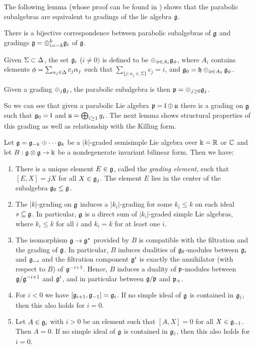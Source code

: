 The following lemma (whose proof can be found in \cite{cap_parabolic_2009}) shows that the parabolic subalgebras are equivalent to gradings of the lie algebra $\mathfrak{g}$.
\begin{lemma}
There is a bijective correspondence between parabolic subalgebras of $\mathfrak{g}$ and gradings $\mathfrak{g}=\oplus_{i=-k}^k \mathfrak{g}_i$ of $\mathfrak{g}$.

	Given $\Sigma\subset\Delta$, the set $\mathfrak{g}_i$ ($i\neq 0)$ is defined to be $\oplus_{\phi\in A_i} \mathfrak{g}_\phi$, where $A_i$ contains elements $\phi=\sum_{\alpha_j\in\Delta} c_j \alpha_j$ such that $\sum_{\{j:\alpha_j\in\Sigma\}} c_j=i$, and $\mathfrak{g}_0=\mathfrak{h}\oplus_{\phi\in A_0} \mathfrak{g}_\phi$.

	Given a grading $\oplus_j \mathfrak{g}_j$, the parabolic subalgebra is then $\mathfrak{p}=\oplus_{j\geq 0}\mathfrak{g}_j$.
\end{lemma}
So we can see that given a parabolic Lie algebra $\mathfrak{p} = \mathfrak{l} \oplus \mathfrak{u}$ there is a grading on $\mathfrak{g}$ such that $\mathfrak{g}_0 = \mathfrak{l}$ and $\mathfrak{u} = \bigoplus_{i \geq 1} g_i$. The next lemma shows structural properties of this grading as well as relationship with the Killing form.
\begin{lemma}
	Let $\mathfrak{g}=\mathfrak{g}_{-k}\oplus\cdots \mathfrak{g}_k$ be a $|k|$-graded semisimple Lie algebra over $\Bbbk=\mathbb{R}$ or $\mathbb{C}$ and let $B:\mathfrak{g}\otimes \mathfrak{g}\to \Bbbk$ be a nondegenerate invariant bilinear form. Then we have:
	\begin{enumerate}
	 \item There is a unique element $E \in \mathfrak{g}$, called the \emph{grading element}, such that \([E,X] = jX\) for all $X \in \mathfrak{g}_j$. The element $E$ lies in the center of the subalgebra $\mathfrak{g}_0 \leq \mathfrak{g}$.
	 \item The $|k|$-grading on $\mathfrak{g}$ induces a $|k_i|$-grading for some $k_i\leq k$ on each ideal $s\subseteq \mathfrak{g}$. In particular, $\mathfrak{g}$ is a direct sum of $|k_i|$-graded simple Lie algebras, where $k_i\leq k$ for all $i$ and $k_i=k$ for at least one $i$.
	 \item The isomorphism $\mathfrak{g} \to \mathfrak{g}^*$ provided by $B$ is compatible with the filtration and the grading of $\mathfrak{g}$. In particular, $B$ induces dualities of $\mathfrak{g}_0$-modules between $\mathfrak{g}_i$ and $\mathfrak{g}_{-i}$ and the filtration component $\mathfrak{g}^i$ is exactly the annihilator (with respect to $B$) of $\mathfrak{g}^{-i+1}$. Hence, $B$ induces a duality of $\mathfrak{p}$-modules between $\mathfrak{g}/\mathfrak{g}^{-i+1}$ and $\mathfrak{g}^i$, and in particular between $\mathfrak{g}/\mathfrak{p}$ and $\mathfrak{p}_+$.  
	 \item For $i<0$ we have $[\mathfrak{g}_{i+1},\mathfrak{g}_{-1}] = \mathfrak{g}_i$. If no simple ideal of $\mathfrak{g}$ is contained in $\mathfrak{g}_)$, then this also holds for $i=0$.
	 \item Let $A\in\mathfrak{g}_i$ with $i>0$ be an element such that $[A,X]=0$ for all $X\in\mathfrak{g}_{-1}$. Then $A=0$. If no simple ideal of $\mathfrak{g}$ is contained in $\mathfrak{g}_)$, then this also holds for $i=0$.
	\end{enumerate}
\end{lemma}

